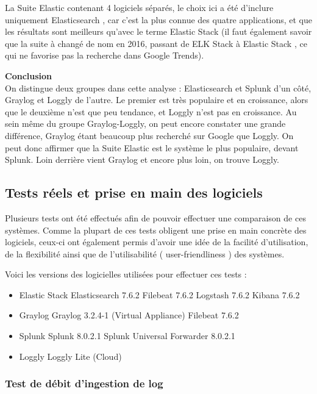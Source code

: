 \documentclass[paper=a4, fontsize=11pt]{scrartcl}
\begin{document}
La Suite Elastic contenant 4 logiciels séparés, le choix ici a été d'inclure uniquement \og Elasticsearch \fg, car c'est la plus connue des quatre applications, et que les résultats sont meilleurs qu'avec le terme \og Elastic Stack \fg (il faut également savoir que la suite à changé de nom en 2016, passant de \og ELK Stack \fg à \og Elastic Stack \fg, ce qui ne favorise pas la recherche dans Google Trends).

\textbf{Conclusion} \\
On distingue deux groupes dans cette analyse : Elasticsearch et Splunk d'un côté, Graylog et Loggly de l'autre. Le premier est très populaire et en croissance, alors que le deuxième n'est que peu tendance, et Loggly n'est pas en croissance. Au sein même du groupe Graylog-Loggly, on peut encore constater une grande différence, Graylog étant beaucoup plus recherché sur Google que Loggly. On peut donc affirmer que la Suite Elastic est le système le plus populaire, devant Splunk. Loin derrière vient Graylog et encore plus loin, on trouve Loggly.

\subsection{Tests réels et prise en main des logiciels}

Plusieurs tests ont été effectués afin de pouvoir effectuer une comparaison de ces systèmes. Comme la plupart de ces tests obligent une prise en main concrète des logiciels, ceux-ci ont également permis d'avoir une idée de la facilité d'utilisation, de la flexibilité ainsi que de l'utilisabilité ( \og user-friendliness \fg) des systèmes.

Voici les versions des logicielles utilisées pour effectuer ces tests :

\begin{itemize}
    \item Elastic Stack
    \subitem Elasticsearch 7.6.2
    \subitem Filebeat 7.6.2
    \subitem Logstash 7.6.2
    \subitem Kibana 7.6.2
    \item Graylog
    \subitem Graylog 3.2.4-1 (Virtual Appliance)
    \subitem Filebeat 7.6.2
    \item Splunk
    \subitem Splunk 8.0.2.1
    \subitem Splunk Universal Forwarder 8.0.2.1
    \item Loggly
    \subitem Loggly Lite (Cloud)
\end{itemize}

\subsubsection{Test de débit d'ingestion de log}
\end{document}
